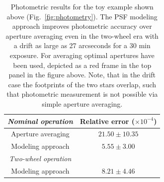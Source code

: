 \documentclass[letterpaper,12pt,whitepaper]{haastex}
\begin{document}
\begin{table}[b]
\begin{center}
\begin{tabular}{c|c}
\emph{Nominal operation} & Relative error ($\times 10^{-4}$)\\ \hline
Aperture averaging &  $21.50 \pm 10.35$ \\ 
Modeling approach  &  $5.55 \pm 3.00$ \\[5mm] 
\emph{Two-wheel operation}  & \\ \hline
Modeling approach &  $8.21 \pm 4.46$ \\
\end{tabular}
\end{center}


\caption{Photometric results for the toy example shown above
  (Fig.~\ref{fig:photometry}). The PSF modeling approach improves
  photometric accuracy over aperture averaging even in the two-wheel
  era with a drift as large as 27 arcseconds for a 30 min exposure.
  For averaging optimal apertures have been used, depicted as a red
  frame in the top panel in the figure above. Note, that in the drift case the footprints of the two
  stars overlap, such that photometric measurement is not possible via
  simple aperture averaging.}

\label{tab:photometry}
\end{table}
\end{document}
